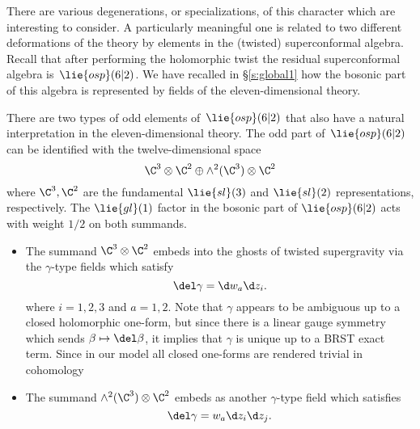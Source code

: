 %
%

\parsec
There are various degenerations, or specializations, of this character which are interesting to consider.
A particularly meaningful one is related to two different deformations of the theory by elements in the (twisted) superconformal algebra.
Recall that after performing the holomorphic twist the residual superconformal algebra is~$\lie{osp}(6|2)$.
We have recalled in \S\ref{s:global1} how the bosonic part of this algebra is represented by fields of the eleven-dimensional theory. 

There are two types of odd elements of~$\lie{osp}(6|2)$ that also have a natural interpretation in the eleven-dimensional theory.
The odd part of~$\lie{osp}(6|2)$ can be identified with the twelve-dimensional space
\[
\C^3 \otimes \C^2 \oplus \wedge^2(\C^3) \otimes \C^2 
\]
where $\C^3, \C^2$ are the fundamental $\lie{sl}(3)$ and $\lie{sl}(2)$ representations, respectively. 
The $\lie{gl}(1)$ factor in the bosonic part of $\lie{osp}(6|2)$ acts with weight $1/2$ on both summands. 

\begin{itemize}
\item The summand $\C^3 \otimes \C^2$ embeds into the ghosts of twisted supergravity via the $\gamma$-type fields which satisfy
\[
\del \gamma = \d w_a \d z_i .
\]
where $i=1,2,3$ and $a = 1,2$.
Note that $\gamma$ appears to be ambiguous up to a closed holomorphic one-form, but since there is a linear gauge symmetry which sends $\beta \mapsto \del \beta$, it implies that $\gamma$ is unique up to a BRST exact term. 
Since in our model all closed one-forms are rendered trivial in cohomology
\item The summand $\wedge^2(\C^3) \otimes \C^2$ embeds as another $\gamma$-type field which satisfies 
\[
\del \gamma = w_a \d z_i \d z_j .
\]
\end{itemize}

